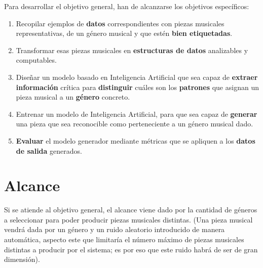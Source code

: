 Para desarrollar el objetivo general, han de alcanzarse los objetivos específicos:

\begin{enumerate}
    \item Recopilar ejemplos de \textbf{datos} correspondientes con piezas musicales representativas, de un género musical y que estén \textbf{bien etiquetadas}.
    
    \item Transformar esas piezas musicales en \textbf{estructuras de datos} analizables y computables.

    \item Diseñar un modelo basado en Inteligencia Artificial que sea capaz de \textbf{extraer información} crítica para \textbf{distinguir} cuáles son los \textbf{patrones} que asignan un pieza musical a un \textbf{género} concreto.

    \item Entrenar un modelo de Inteligencia Artificial, para que sea capaz de \textbf{generar} una pieza que sea reconocible como perteneciente a un género musical dado.

    \item \textbf{Evaluar} el modelo generador mediante métricas que se apliquen a los \textbf{datos de salida} generados.
\end{enumerate}

\section{Alcance}
Si se atiende al objetivo general, el alcance viene dado por la cantidad de géneros a seleccionar para poder producir piezas musicales distintas. (Una pieza musical vendrá dada por un género y un ruido aleatorio introducido de manera automática, aspecto este que limitaría el número máximo de piezas musicales distintas a producir por el sistema; es por eso que este ruido habrá de ser de gran dimensión).

